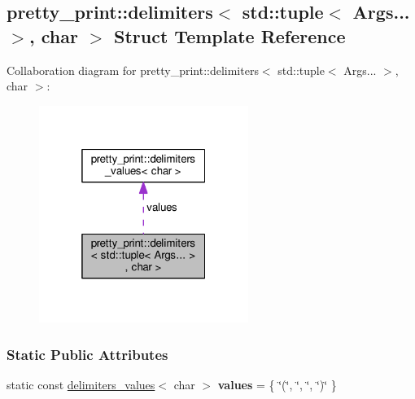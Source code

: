 \hypertarget{structpretty__print_1_1delimiters_3_01std_1_1tuple_3_01Args_8_8_8_01_4_00_01char_01_4}{}\subsection{pretty\+\_\+print\+:\+:delimiters$<$ std\+:\+:tuple$<$ Args... $>$, char $>$ Struct Template Reference}
\label{structpretty__print_1_1delimiters_3_01std_1_1tuple_3_01Args_8_8_8_01_4_00_01char_01_4}


Collaboration diagram for pretty\+\_\+print\+:\+:delimiters$<$ std\+:\+:tuple$<$ Args... $>$, char $>$\+:\nopagebreak
\begin{figure}[H]
\begin{center}
\leavevmode
\includegraphics[width=193pt]{structpretty__print_1_1delimiters_3_01std_1_1tuple_3_01Args_8_8_8_01_4_00_01char_01_4__coll__graph}
\end{center}
\end{figure}
\subsubsection*{Static Public Attributes}
\begin{DoxyCompactItemize}
\item 
static const \hyperlink{structpretty__print_1_1delimiters__values}{delimiters\+\_\+values}$<$ char $>$ {\bfseries values} = \{ \char`\"{}(\char`\"{}, \char`\"{}, \char`\"{}, \char`\"{})\char`\"{} \}\hypertarget{structpretty__print_1_1delimiters_3_01std_1_1tuple_3_01Args_8_8_8_01_4_00_01char_01_4_a6a3918ef5b9547beb7187460bc5d7180}{}\label{structpretty__print_1_1delimiters_3_01std_1_1tuple_3_01Args_8_8_8_01_4_00_01char_01_4_a6a3918ef5b9547beb7187460bc5d7180}

\end{DoxyCompactItemize}


